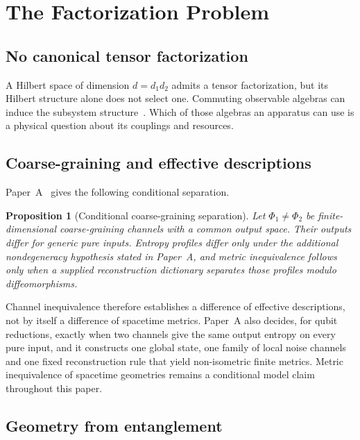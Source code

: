 \documentclass[12pt,a4paper]{article}
\newtheorem{proposition}[theorem]{Proposition}
\begin{document}
\section{The Factorization Problem}
\label{sec:factorization}

\subsection{No canonical tensor factorization}

A Hilbert space of dimension $d=d_1d_2$ admits a tensor factorization,
but its Hilbert structure alone does not select one. Commuting observable
algebras can induce the subsystem structure~\cite{Zanardi2001,Zanardi2004}.
Which of those algebras an apparatus can use is a physical question about
its couplings and resources.

\subsection{Coarse-graining and effective descriptions}

Paper~A~\cite{Liu2026PaperA} gives the following conditional separation.

\begin{proposition}[Conditional coarse-graining separation]
\label{prop:inequiv}
Let $\Phi_1\ne\Phi_2$ be finite-dimensional coarse-graining channels with a common output space. Their outputs differ for generic pure inputs. Entropy profiles differ only under the additional nondegeneracy hypothesis stated in Paper~A, and metric inequivalence follows only when a supplied reconstruction dictionary separates those profiles modulo diffeomorphisms.
\end{proposition}

Channel inequivalence therefore establishes a difference of effective descriptions, not by itself a difference of spacetime metrics. Paper~A also decides, for qubit reductions, exactly when two channels give the same output entropy on every pure input, and it constructs one global state, one family of local noise channels and one fixed reconstruction rule that yield non-isometric finite metrics. Metric inequivalence of spacetime geometries remains a conditional model claim throughout this paper.

\subsection{Geometry from entanglement}
\end{document}

